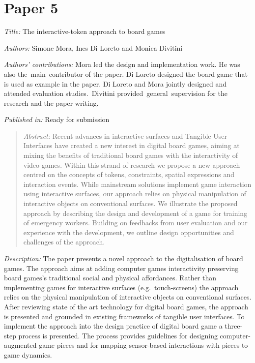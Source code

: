 \section[The interactive-token approach to board games]{Paper 5}\label{paper-5}

\emph{Title:} The interactive-token approach to board games

\emph{Authors:} Simone Mora, Ines Di Loreto and Monica Divitini

\emph{Authors' contributions:} Mora led the design and implementation work. He was also the~main~contributor of the paper. Di Loreto designed the board game that is used as example in the paper. Di Loreto and Mora jointly designed and attended evaluation studies.~Divitini provided~general~supervision for the research and the paper writing.

\emph{Published in:} Ready for submission
\begin{quote}
	\emph{Abstract:} Recent advances in interactive surfaces and Tangible User Interfaces have created a new interest in digital board games, aiming at mixing the benefits of traditional board games with the interactivity of video games. Within this strand of research we propose a new approach centred on the concepts of tokens, constraints, spatial expressions and interaction events. While mainstream solutions implement game interaction using interactive surfaces, our approach relies on physical manipulation of interactive objects on conventional surfaces. We illustrate the proposed approach by describing the design and development of a game for training of emergency workers. Building on feedbacks from user evaluation and our experience with the development, we outline design opportunities and challenges of the approach. 
\end{quote}

\emph{Description:} The paper presents a novel approach to the digitalisation of board games. The approach aims at adding computer games interactivity preserving board games's traditional social and physical affordances. Rather than implementing games for interactive surfaces (e.g.~touch-screens) the approach relies on the physical manipulation of interactive objects on conventional surfaces. After reviewing state of the art technology for digital board games, the approach is presented and grounded in existing frameworks of tangible user interfaces. To implement the approach into the design practice of digital board game a three-step process is presented. The process provides guidelines for designing computer-augmented game pieces and for mapping sensor-based interactions with pieces to game dynamics.

